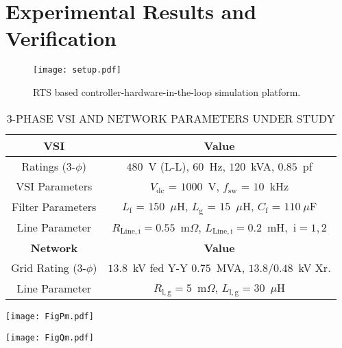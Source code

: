\documentclass[journal]{IEEEtran}
\begin{document}
\section{Experimental Results and Verification}\label{result}
\begin{figure}[t]
	\centering
    \texttt{[image: setup.pdf]}%
	\caption{RTS based controller-hardware-in-the-loop simulation platform.}
	\label{fig:setup}
\end{figure}
\renewcommand{\arraystretch}{1.2}
\begin{table}[t]
\centering
\caption{$3$-PHASE VSI AND NETWORK PARAMETERS UNDER STUDY}
\label{table:data}
\begin{tabular}{|c|c|}
\hline 
\textbf{VSI} & \textbf{Value}    \\ \hline \hline
Ratings ($3$-$\phi$) & $480$~V (L-L), $60$~Hz, $120$~kVA, $0.85$~pf \\ \hline
VSI Parameters & $V_\mathrm{dc}$ = $1000$~V, $f_\mathrm{sw}$ = $10$~kHz \\ \hline
Filter Parameters & $L_\mathrm{f}$ = $150$~$\mu$H, $L_\mathrm{g}$ = $15$~$\mu$H, $C_\mathrm{f}$ = $110~\mu$F \\ \hline
Line Parameter & $R_\mathrm{Line,i}=0.55$~m$\Omega$, $L_\mathrm{Line,i}=0.2$~mH,~$\mathrm{i}=1,2$  \\ \hline \hline \hline
\textbf{Network} & \textbf{Value}    \\ \hline \hline
Grid Rating ($3$-$\phi$) &  $13.8$~kV fed $\mathrm{Y}$-$\mathrm{Y}$ $0.75$~MVA, $13.8/0.48$~kV Xr. \\ \hline
Line Parameter & $R_\mathrm{l,g}=5$~m$\Omega$, $L_\mathrm{l,g}=30$~$\mu$H \\ \hline
\end{tabular}
\end{table}
\begin{figure*}[t]
	\centering
    \texttt{[image: FigPm.pdf]}%
	\caption{Profile of active power flow in critical infrastructure of Fig.~\ref{fig:setup} during the sequence of events considered in test case.}
	\label{fig:P}
\end{figure*}
\begin{figure*}[t]
	\centering
    \texttt{[image: FigQm.pdf]}%
	\caption{Profile of reactive power flow in critical infrastructure of Fig.~\ref{fig:setup} during the sequence of events considered in test case.}
	\label{fig:Q}
\end{figure*}
\end{document}
